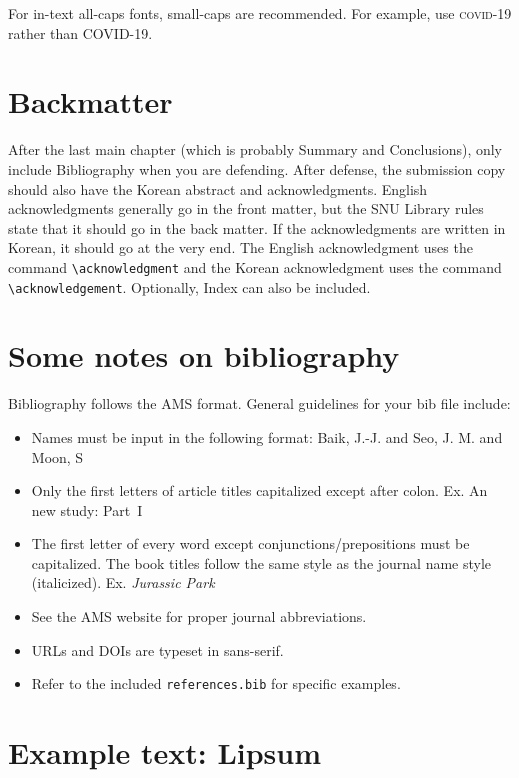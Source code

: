 \documentclass[twoside,phd,4x6]{snuthesis}
\theoremstyle{newdef}
\theoremstyle{slthm}
\begin{document}
For in-text all-caps fonts, small-caps are recommended. For example, use {\large\textsc{covid-}}19 rather than COVID-19.

\section{Backmatter} 

After the last main chapter (which is probably Summary and Conclusions), only include Bibliography when you are defending. After defense, the submission copy should also have the Korean abstract and acknowledgments. English acknowledgments generally go in the front matter, but the SNU Library rules state that it should go in the back matter. If the acknowledgments are written in Korean, it should go at the very end. The English acknowledgment uses the command \verb|\acknowledgment| and the Korean acknowledgment uses the command \verb|\acknowledgement|. Optionally, Index can also be included.

\section{Some notes on bibliography}

Bibliography follows the AMS format. General guidelines for your bib file include:\begin{itemize}
    \item Names must be input in the following format: Baik, J.-J. and Seo, J. M. and Moon, S
    \item Only the first letters of article titles capitalized except after colon. Ex. An new study: {P}art~{I}
    \item The first letter of every word except conjunctions/prepositions must be capitalized. The book titles follow the same style as the journal name style (italicized). Ex. \emph{Jurassic Park}
    \item See the AMS website for proper journal abbreviations.
    \item URLs and DOIs are typeset in sans-serif.
    \item Refer to the included \verb|references.bib| for specific examples.
\end{itemize}

\section{Example text: Lipsum}
\lipsum[10-13]

\end{document}
